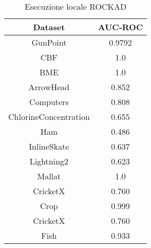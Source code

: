 \begin{table}[h]
    \centering
    \begin{tabular}{|c|c|}
        \hline
        \textbf{Dataset} & \textbf{AUC-ROC}\\
        \hline
         GunPoint &0.9792 \\
         \hline
         CBF& 1.0\\
         \hline
         BME& 1.0\\
         \hline
         ArrowHead& 0.852\\
         \hline
         Computers& 0.808\\
         \hline
         ChlorineConcentration& 0.655\\
         \hline
         Ham& 0.486\\
         \hline
         InlineSkate& 0.637\\
         \hline
         Lightning2& 0.623\\
         \hline
         Mallat& 1.0\\
         \hline
         CricketX& 0.760\\
         \hline
         Crop& 0.999\\
         \hline
         CricketX& 0.760\\
         \hline
         Fish& 0.933\\
         \hline
    \end{tabular}
    \label{tab:rockad_paper_table}
    \caption{Esecuzione locale ROCKAD}
\end{table}